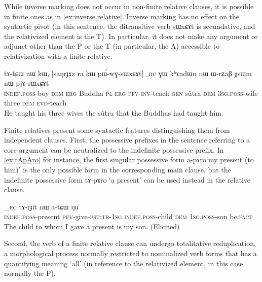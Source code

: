\documentclass[oldfontcommands,oneside,a4paper,11pt]{article}
\newcommand{\ipa}[1]{{\phon #1}} %
\newcommand{\topic}{\textsc{dem}}
\begin{document}
While inverse marking does not occur in non-finite relative clauses, it is possible in finite ones as in \ref{ex:inverse.relative}. Inverse marking has no effect on the syntactic pivot (in this sentence, the ditransitive verb \ipa{sɯxɕɤt} is secundative, and the relativized element is the T). In particular, it does not make any argument or adjunct other than the P or the T (in particular, the A) accessible to relativization with a finite relative.

     \begin{exe}
   \ex \label{ex:inverse.relative}
 \gll
\ipa{tɤ-tɕɯ}  	\ipa{nɯ}  	\ipa{kɯ,}  	[\ipa{saŋrɟɤz}  	\ipa{ra}  	\ipa{kɯ}  	\ipa{pɯ́-wɣ-sɯxɕɤt}]_{\textsc{rc}}  	\ipa{ɣɯ}  	\ipa{kʰɤndɯn}  	\ipa{nɯ}  	\ipa{ɯ-rʑaβ}  	\ipa{χsɯm}  	\ipa{nɯ}  	\ipa{pjɤ-sɯxɕɤt}  \\
\textsc{indef.poss}-boy \textsc{dem} \textsc{erg} Buddha \textsc{pl} \textsc{erg} \textsc{pfv-inv}-teach   \textsc{gen} sûtra \textsc{dem} \textsc{3sg.poss}-wife three \textsc{dem} \textsc{evd}-teach \\
\glt He taught his three wives the sûtra that the Buddhas had taught him.
\end{exe}


Finite relatives present some syntactic features distinguishing them from independent clauses. First, the possessive prefixes in the sentence referring to a core argument can be neutralized to the indefinite possessive prefix. In \ref{ex:tApAro} for instance, the first singular possessive form \ipa{a-pɤro}`my present (to him)' is the only possible form in the corresponding main clause, but the indefinite possessive form \ipa{tɤ-pɤro} `a present' can be used instead in the relative clause.

		\begin{exe}
\ex \label{ex:tApAro}
\gll
	[\ipa{tɤ-pɤro}  	\ipa{nɯ-mbi-t-a}]_{\textsc{rc}}  	\ipa{tɤ-rɟit}  	\ipa{nɯ}  	\ipa{a-tɕɯ}  	\ipa{ŋu}   \\
	\textsc{indef.poss}-present \textsc{pfv}-give-\textsc{pst:tr-1sg} 	\textsc{indef.poss}-child \topic{} \textsc{1sg.poss}-son be:\textsc{fact} \\
\glt The child to whom I gave a present is my son. (Elicited)
 	  \end{exe} 
 	  
Second, the verb of a finite relative clause can undergo totalitative reduplication, a morphological process normally restricted to nominalized verb forms that has a quantifying meaning `all' (in reference to the relativized element, in this case normally the P).
\end{document}
